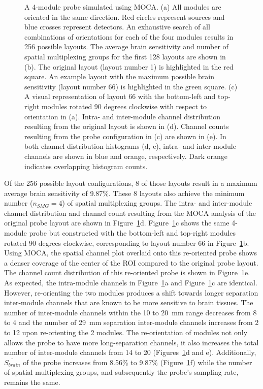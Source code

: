 \begin{figure}
\begin{center}
    \end{center}
    \caption{A 4-module probe simulated using MOCA. (a) All modules are oriented in the same direction. Red circles represent sources and blue crosses represent detectors. An exhaustive search of all combinations of orientations for each of the four modules results in 256 possible layouts. The average brain sensitivity and number of spatial multiplexing groups for the first 128 layouts are shown in (b). The original layout (layout number 1) is highlighted in the red square. An example layout with the maximum possible brain sensitivity (layout number 66) is highlighted in the green square. (c) A visual representation of layout 66 with the bottom-left and top-right modules rotated 90 degrees clockwise with respect to orientation in (a). Intra- and inter-module channel distribution resulting from the original layout is shown in (d). Channel counts resulting from the probe configuration in (c) are shown in (e). In both channel distribution histograms (d, e), intra- and inter-module channels are shown in blue and orange, respectively. Dark orange indicates overlapping histogram counts.} 
    \label{fig:orientation}
\end{figure} 

Of the 256 possible layout configurations, 8 of those layouts result in a maximum average brain sensitivity of 9.87\%. These 8 layouts also achieve the minimum number ($n_{SMG}=4$) of spatial multiplexing groups. The intra- and inter-module channel distribution and channel count resulting from the \ac{MOCA} analysis of the original probe layout are shown in Figure~\ref{fig:orientation}d. Figure~\ref{fig:orientation}c shows the same 4-module probe but constructed with the bottom-left and top-right modules rotated 90 degrees clockwise, corresponding to layout number 66 in Figure~\ref{fig:orientation}b. Using \ac{MOCA}, the spatial channel plot overlaid onto this re-oriented probe shows a denser coverage of the center of the \ac{ROI} compared to the original probe layout. The channel count distribution of this re-oriented probe is shown in Figure~\ref{fig:orientation}e. As expected, the intra-module channels in Figure~\ref{fig:orientation}a and Figure~\ref{fig:orientation}c are identical. However, re-orienting the two modules produces a shift towards longer separation inter-module channels that are known to be more sensitive to brain tissues. The number of inter-module channels within the 10 to 20~mm range decreases from 8 to 4 and the number of 29~mm separation inter-module channels increases from 2 to 12 upon re-orienting the 2 modules. The re-orientation of modules not only allows the probe to have more long-separation channels, it also increases the total number of inter-module channels from 14 to 20 (Figures~\ref{fig:orientation}d and e). Additionally, $\overline{S_{brain}}$ of the probe increases from 8.56\% to 9.87\% (Figure~\ref{fig:orientation}f) while the number of spatial multiplexing groups, and subsequently the probe's sampling rate, remains the same.


